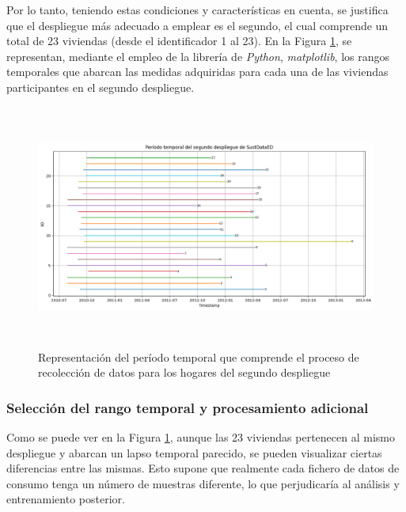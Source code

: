 \vspace{3mm}

Por lo tanto, teniendo estas condiciones y características en cuenta, se justifica que el despliegue más adecuado a emplear es el segundo, el cual comprende un total de 23 viviendas (desde el identificador 1 al 23). En la Figura \ref{fig:despliegue2}, se representan, mediante el empleo de la librería de \textit{Python}, \textit{matplotlib}, los rangos temporales que abarcan las medidas adquiridas para cada una de las viviendas participantes en el segundo despliegue.

\vspace{3mm}

\begin{figure}[h!]
    \centering
    \includegraphics[width=1\textwidth,height=8cm]{img/diseno/despliegue2.png}
    \caption{Representación del período temporal que comprende el proceso de recolección de datos para los hogares del segundo despliegue}
    \label{fig:despliegue2}
\end{figure}

\subsubsection{Selección del rango temporal y procesamiento adicional}
\label{sec:rango}

Como se puede ver en la Figura \ref{fig:despliegue2}, aunque las 23 viviendas pertenecen al mismo despliegue y abarcan un lapso temporal parecido, se pueden visualizar ciertas diferencias entre las mismas. Esto supone que realmente cada fichero de datos de consumo tenga un número de muestras diferente, lo que perjudicaría al análisis y entrenamiento posterior. 


